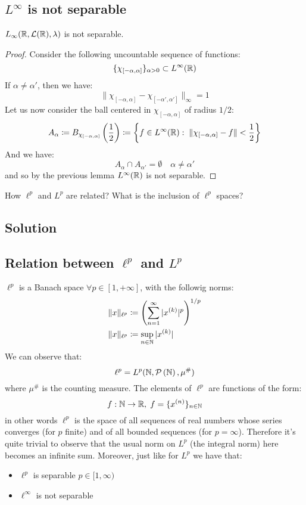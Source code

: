
\subsection{\texorpdfstring{$L^\infty$}{L infinity} is not separable}
$L_\infty(\mathbb{R}, \mathcal{L}(\mathbb{R}), \lambda)$ is not separable.

\begin{proof}
    Consider the following  uncountable sequence of functions:
    \[ \{\chi_{[-\alpha,\alpha]}\}_{\alpha>0} \subset L^\infty(\mathbb{R}) \]
    If $\alpha\neq\alpha'$, then we have:
    \[ \| \chi_{[-\alpha,\alpha]} - \chi_{[-\alpha',\alpha']} \|_\infty = 1 \]
    Let us now consider the ball centered in $\chi_{[-\alpha,\alpha]}$ of radius $1/2$:
    \[ A_\alpha \coloneqq B_{\chi_{[-\alpha,\alpha]}}\left(\frac{1}{2}\right) \coloneqq \left\{ f\in L^\infty(\mathbb{R}): \; \|\chi_{[-\alpha,\alpha]}-f\|<\frac{1}{2} \right\}\] %
    And we have:
    \[ A_\alpha \cap A_{\alpha'} = \emptyset \quad \alpha \neq \alpha' \]
    and so by the previous lemma $L^\infty(\mathbb{R})$ is not separable.
\end{proof}


\question
How $\ell^p$ and $L^p$ are related? What is the inclusion of $\ell^p$ spaces?

\subsection*{Solution}

\subsection{Relation between \texorpdfstring{$\ell^p$}{lp} and \texorpdfstring{$L^p$}{Lp}}
$\ell^p$ is a Banach space $\forall p \in [1,+\infty]$, with the followig norms:
\begin{align*}
    \|x\|_{\ell^p} & \coloneqq \left( \sum_{n=1}^\infty |x^{(k)}|^p \right)^{1/p} \\
    \|x\|_{\ell^p} & \coloneqq \sup_{n\in\mathbb{N}} |x^{(k)}| 
\end{align*}
We can observe that: 
\[ \ell^p = L^p (\mathbb{N}, \mathcal{P}\left(\mathbb{N}\right), \mu^\#)\]
where $\mu^\#$ is the counting measure.
The elements of $\ell^p$ are functions of the form:
\[ f:\mathbb{N}\to\mathbb{R}, \; f=\{ x^{(n)} \}_{n\in\mathbb{N}} \]
in other words $\ell^p$ is the space of all sequences of real numbers whose series converges (for $p$ finite) and of all bounded sequences (for $p=\infty$).
Therefore it's quite trivial to observe that the usual norm on $L^p$ (the integral norm) here becomes an infinite sum.
Moreover, just like for $L^p$ we have that:
\begin{itemize}
    \item $\ell^p$ is separable $p\in[1,\infty)$
    \item $\ell^\infty$ is not separable
\end{itemize}

